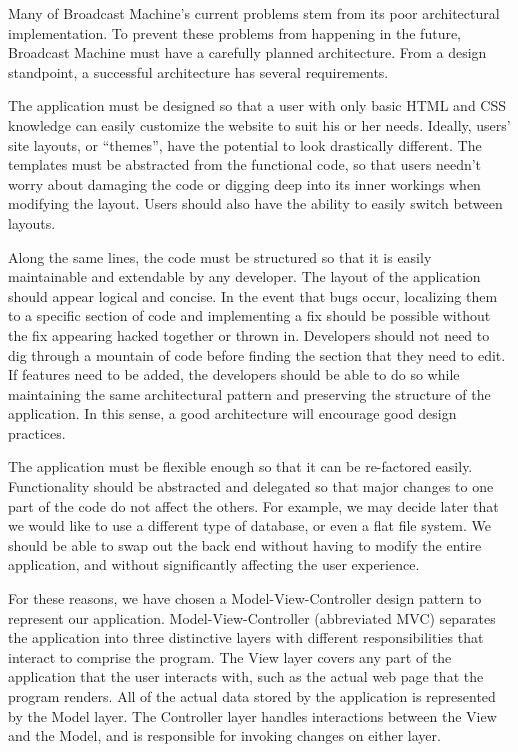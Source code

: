 \documentclass[a4paper,12pt]{report}
\begin{document}
	Many of Broadcast Machine’s current problems stem from its poor architectural implementation. To prevent these problems from happening in the future, Broadcast Machine must have a carefully planned architecture. From a design standpoint, a successful architecture has several requirements.

The application must be designed so that a user with only basic HTML and CSS knowledge can easily customize the website to suit his or her needs. Ideally, users’ site layouts, or “themes”, have the potential to look drastically different. The templates must be abstracted from the functional code, so that users needn’t worry about damaging the code or digging deep into its inner workings when modifying the layout. Users should also have the ability to easily switch between layouts.

Along the same lines, the code must be structured so that it is easily maintainable and extendable by any developer. The layout of the application should appear logical and concise. In the event that bugs occur, localizing them to a specific section of code and implementing a fix should be possible without the fix appearing hacked together or thrown in. Developers should not need to dig through a mountain of code before finding the section that they need to edit. If features need to be added, the developers should be able to do so while maintaining the same architectural pattern and preserving the structure of the application. In this sense, a good architecture will encourage good design practices.

The application must be flexible enough so that it can be re-factored easily. Functionality should be abstracted and delegated so that major changes to one part of the code do not affect the others. For example, we may decide later that we would like to use a different type of database, or even a flat file system. We should be able to swap out the back end without having to modify the entire application, and without significantly affecting the user experience.

For these reasons, we have chosen a Model-View-Controller design pattern to represent our application. Model-View-Controller (abbreviated MVC) separates the application into three distinctive layers with different responsibilities that interact to comprise the program. The View layer covers any part of the application that the user interacts with, such as the actual web page that the program renders. All of the actual data stored by the application is represented by the Model layer. The Controller layer handles interactions between the View and the Model, and is responsible for invoking changes on either layer.
\end{document}
